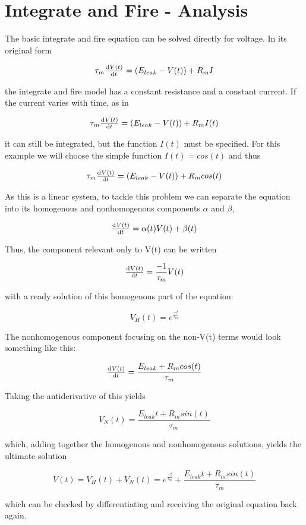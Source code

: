 \documentclass[12pt]{article}
\begin{document}
\maketitle

\section{Integrate and Fire - Analysis}

The basic integrate and fire equation can be solved directly for voltage.  In its original form

$$ \tau_m\od{V(t)}{t}=(E_{leak}-V(t))+R_mI $$

the integrate and fire model has a constant resistance and a constant current.  If the current varies with time, as in

$$ \tau_m\od{V(t)}{t}=(E_{leak}-V(t))+R_mI(t) $$

it can still be integrated, but the function $I(t)$ must be specified.  For this example we will choose the simple function $I(t)=cos(t)$ and thus

$$ \tau_m\od{V(t)}{t}=(E_{leak}-V(t))+R_mcos(t) $$

As this is a linear system, to tackle this problem we can separate the equation into its homogenous and nonhomogenous components $\alpha$ and $\beta$, 

$$ \od{V(t)}{t}=\alpha(t)V(t)+\beta(t) $$

Thus, the component relevant only to V(t) can be written

$$ \od{V(t)}{t}=\frac{-1}{\tau_m}V(t) $$

with a ready solution of this homogenous part of the equation:

$$ V_H(t)=e^{\frac{-t}{ \tau_m}} $$

The nonhomogenous component focusing on the non-V(t) terms would look something like this:

$$ \od{V(t)}{t}=\frac{E_{leak}+R_mcos(t)}{\tau_m} $$

Taking the antiderivative of this yields

$$ V_N(t)=\frac{E_{leak}t+R_msin(t)}{\tau_m} $$

which, adding together the homogenous and nonhomogenous solutions, yields the ultimate solution

$$ V(t)=V_H(t)+V_N(t)=e^{\frac{-t}{\tau_m}}+\frac{E_{leak}t+R_msin(t)}{\tau_m} $$

which can be checked by differentiating and receiving the original equation back again.
\end{document}
